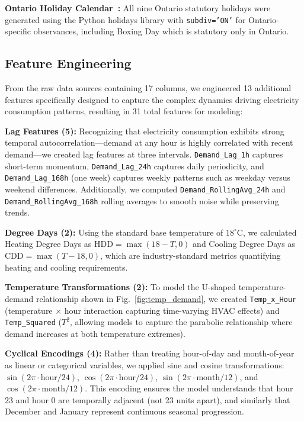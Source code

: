 \documentclass[conference]{IEEEtran}
\begin{document}
\textbf{Ontario Holiday Calendar~\cite{holidays}:} All nine Ontario statutory holidays were generated using the Python holidays library with \texttt{subdiv='ON'} for Ontario-specific observances, including Boxing Day which is statutory only in Ontario.

\subsection{Feature Engineering}

From the raw data sources containing 17 columns, we engineered 13 additional features specifically designed to capture the complex dynamics driving electricity consumption patterns, resulting in 31 total features for modeling:

\textbf{Lag Features (5):} Recognizing that electricity consumption exhibits strong temporal autocorrelation---demand at any hour is highly correlated with recent demand---we created lag features at three intervals. \texttt{Demand\_Lag\_1h} captures short-term momentum, \texttt{Demand\_Lag\_24h} captures daily periodicity, and \texttt{Demand\_Lag\_168h} (one week) captures weekly patterns such as weekday versus weekend differences. Additionally, we computed \texttt{Demand\_RollingAvg\_24h} and \texttt{Demand\_RollingAvg\_168h} rolling averages to smooth noise while preserving trends.

\textbf{Degree Days (2):} Using the standard base temperature of $18^\circ$C, we calculated Heating Degree Days as $\text{HDD} = \max(18 - T, 0)$ and Cooling Degree Days as $\text{CDD} = \max(T - 18, 0)$, which are industry-standard metrics quantifying heating and cooling requirements.

\textbf{Temperature Transformations (2):} To model the U-shaped temperature-demand relationship shown in Fig.~\ref{fig:temp_demand}, we created \texttt{Temp\_x\_Hour} (temperature $\times$ hour interaction capturing time-varying HVAC effects) and \texttt{Temp\_Squared} ($T^2$, allowing models to capture the parabolic relationship where demand increases at both temperature extremes).

\textbf{Cyclical Encodings (4):} Rather than treating hour-of-day and month-of-year as linear or categorical variables, we applied sine and cosine transformations: $\sin(2\pi \cdot \text{hour}/24)$, $\cos(2\pi \cdot \text{hour}/24)$, $\sin(2\pi \cdot \text{month}/12)$, and $\cos(2\pi \cdot \text{month}/12)$. This encoding ensures the model understands that hour 23 and hour 0 are temporally adjacent (not 23 units apart), and similarly that December and January represent continuous seasonal progression.
\end{document}
